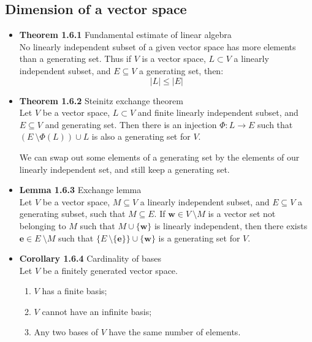 \documentclass[11pt,a4paper]{article}
\begin{document}
\subsection{Dimension of a vector space}

\begin{itemize}

    \item \textbf{Theorem 1.6.1} Fundamental estimate of linear algebra \\
        No linearly independent subset of a given vector space has more elements than a
        generating set.
        Thus if $V$ is a vector space, $L \subset V$ a linearly independent subset,
        and $E \subseteq V$ a generating set, then:
        \[
            |L| \leq |E|
        \]

    \item \textbf{Theorem 1.6.2} Steinitz exchange theorem \\
        Let $V$ be a vector space, $L \subset V$ and finite linearly independent subset,
        and $E \subseteq V$ and generating set.
        Then there is an injection $\Phi : L \to E$ such that
        $(E \ \setminus \Phi(L)) \cup L$ is also a generating set for $V$.

        We can swap out some elements of a generating set by the elements of our linearly
        independent set, and still keep a generating set.

    \item \textbf{Lemma 1.6.3} Exchange lemma \\
        Let $V$ be a vector space, $M \subseteq V$ a linearly independent subset,
        and $E \subseteq V$ a generating subset, such that $M \subseteq E$.
        If $\textbf{w} \in V \ \setminus M$ is a vector set not belonging to $M$ such that
        $M \cup \{\textbf{w}\}$ is linearly independent, then there exists
        $\textbf{e} \in E \ \setminus M$ such that
        $\{E \ \setminus \{\textbf{e}\}\} \cup \{\textbf{w} \}$ is a generating set for $V$.

    \item \textbf{Corollary 1.6.4} Cardinality of bases \\
        Let $V$ be a finitely generated vector space.
        \begin{enumerate}
            \item $V$ has a finite basis;
            \item $V$ cannot have an infinite basis;
            \item Any two bases of $V$ have the same number of elements.
        \end{enumerate}


\end{itemize}
\end{document}
